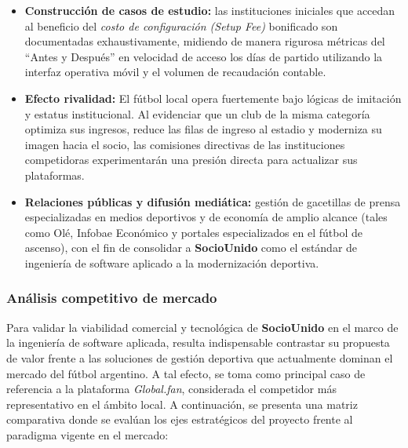 \begin{itemize}
    \item \textbf{Construcción de casos de estudio:} las instituciones iniciales que accedan al beneficio del \textit{costo de configuración (Setup Fee)} bonificado son documentadas exhaustivamente, midiendo de manera rigurosa métricas del ``Antes y Después'' en velocidad de acceso los días de partido utilizando la interfaz operativa móvil y el volumen de recaudación contable.
    \newpage
    \item \textbf{Efecto rivalidad:} El fútbol local opera fuertemente bajo lógicas de imitación y estatus institucional. Al evidenciar que un club de la misma categoría optimiza sus ingresos, reduce las filas de ingreso al estadio y moderniza su imagen hacia el socio, las comisiones directivas de las instituciones competidoras experimentarán una presión directa para actualizar sus plataformas.
    \item \textbf{Relaciones públicas y difusión mediática:} gestión de gacetillas de prensa especializadas en medios deportivos y de economía de amplio alcance (tales como Olé, Infobae Económico y portales especializados en el fútbol de ascenso), con el fin de consolidar a \textbf{SocioUnido} como el estándar de ingeniería de software aplicado a la modernización deportiva.
\end{itemize}

\subsubsection{Análisis competitivo de mercado}

Para validar la viabilidad comercial y tecnológica de \textbf{SocioUnido} en el marco de la ingeniería de software aplicada, resulta indispensable contrastar su propuesta de valor frente a las soluciones de gestión deportiva que actualmente dominan el mercado del fútbol argentino. A tal efecto, se toma como principal caso de referencia a la plataforma \textit{Global.fan}, considerada el competidor más representativo en el ámbito local. A continuación, se presenta una matriz comparativa donde se evalúan los ejes estratégicos del proyecto frente al paradigma vigente en el mercado:

